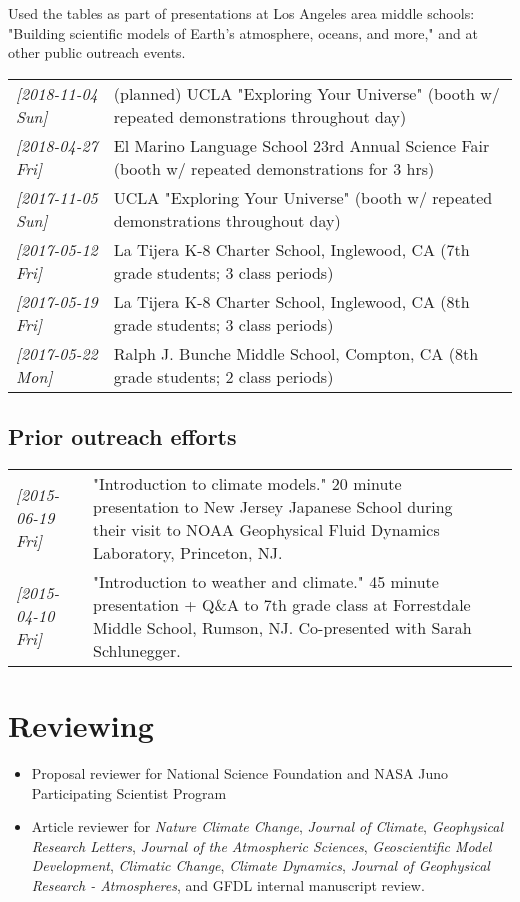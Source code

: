 \documentclass[12pt,letterpaper]{shillcv}
\begin{document}
Used the tables as part of presentations at Los Angeles area middle schools:
"Building scientific models of Earth's atmosphere, oceans, and more," and at
other public outreach events.
\begin{center}
\begin{tabular}{ll}
\textit{[2018-11-04 Sun]} & (planned) UCLA "Exploring Your Universe" (booth w/ repeated demonstrations throughout day)\\
\textit{[2018-04-27 Fri]} & El Marino Language School 23rd Annual Science Fair (booth w/ repeated demonstrations for 3 hrs)\\
\textit{[2017-11-05 Sun]} & UCLA "Exploring Your Universe" (booth w/ repeated demonstrations throughout day)\\
\textit{[2017-05-12 Fri]} & La Tijera K-8 Charter School, Inglewood, CA (7th grade students; 3 class periods)\\
\textit{[2017-05-19 Fri]} & La Tijera K-8 Charter School, Inglewood, CA (8th grade students; 3 class periods)\\
\textit{[2017-05-22 Mon]} & Ralph J. Bunche Middle School, Compton, CA (8th grade students; 2 class periods)\\
\end{tabular}
\end{center}
\subsection*{Prior outreach efforts}
\label{sec:org43ce0e3}
\begin{center}
\begin{tabularx}{\textwidth}{lX}
\textit{[2015-06-19 Fri]} & "Introduction to climate models."  20 minute presentation to New Jersey Japanese School during their visit to NOAA Geophysical Fluid Dynamics Laboratory, Princeton, NJ. &  &  & \\
\textit{[2015-04-10 Fri]} & "Introduction to weather and climate."  45 minute presentation + Q\&A to 7th grade class at Forrestdale Middle School, Rumson, NJ.  Co-presented with Sarah Schlunegger. &  &  & \\
\end{tabularx}
\end{center}
\section*{Reviewing}
\label{sec:org740226c}
\begin{itemize}
\item Proposal reviewer for National Science Foundation and NASA Juno Participating
Scientist Program
\item Article reviewer for \emph{Nature Climate Change}, \emph{Journal of Climate},
\emph{Geophysical Research Letters}, \emph{Journal of the Atmospheric Sciences},
\emph{Geoscientific Model Development}, \emph{Climatic Change}, \emph{Climate Dynamics},
\emph{Journal of Geophysical Research - Atmospheres}, and GFDL internal manuscript
review.
\end{itemize}
\end{document}
